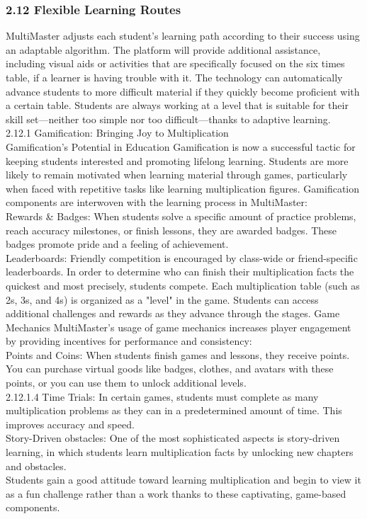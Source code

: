 \documentclass[BTech]{audiss}
\begin{document}
\subsubsection{2.12 Flexible Learning Routes}
MultiMaster adjusts each student's learning path according to their success using an adaptable algorithm. The platform will provide additional assistance, including visual aids or activities that are specifically focused on the six times table, if a learner is having trouble with it. The technology can automatically advance students to more difficult material if they quickly become proficient with a certain table. Students are always working at a level that is suitable for their skill set—neither too simple nor too difficult—thanks to adaptive learning.\\
2.12.1 Gamification: Bringing Joy to Multiplication\\
Gamification's Potential in Education Gamification is now a successful tactic for keeping students interested and promoting lifelong learning. Students are more likely to remain motivated when learning material through games, particularly when faced with repetitive tasks like learning multiplication figures. Gamification components are interwoven with the learning process in MultiMaster:\\
Rewards & Badges: When students solve a specific amount of practice problems, reach accuracy milestones, or finish lessons, they are awarded badges. These badges promote pride and a feeling of achievement.\\
Leaderboards: Friendly competition is encouraged by class-wide or friend-specific leaderboards. In order to determine who can finish their multiplication facts the quickest and most precisely, students compete.
Each multiplication table (such as 2s, 3s, and 4s) is organized as a "level" in the game. Students can access additional challenges and rewards as they advance through the stages.
Game Mechanics MultiMaster's usage of game mechanics increases player engagement by providing incentives for performance and consistency:\\
Points and Coins: When students finish games and lessons, they receive points. You can purchase virtual goods like badges, clothes, and avatars with these points, or you can use them to unlock additional levels.\\ 2.12.1.4 Time Trials: In certain games, students must complete as many multiplication problems as they can in a predetermined amount of time. This improves accuracy and speed.\\
Story-Driven obstacles: One of the most sophisticated aspects is story-driven learning, in which students learn multiplication facts by unlocking new chapters and obstacles.\\
Students gain a good attitude toward learning multiplication and begin to view it as a fun challenge rather than a work thanks to these captivating, game-based components.
\end{document}
